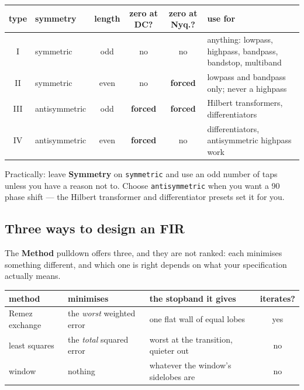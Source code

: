 \documentclass[11pt,a4paper]{article}
\newcommand{\ctl}[1]{\textbf{#1}}
\newcommand{\lit}[1]{\texttt{#1}}
\begin{document}
\begin{center}
\begin{tabular}{@{}clccc>{\raggedright\arraybackslash}p{45mm}@{}}
  \toprule
  \textbf{type} & \textbf{symmetry} & \textbf{length} &
  \textbf{zero at DC?} & \textbf{zero at Nyq.?} & \textbf{use for} \\
  \midrule
  I   & symmetric     & odd  & no  & no  & anything: lowpass, highpass,
                                            bandpass, bandstop, multiband \\
  \addlinespace
  II  & symmetric     & even & no  & \textbf{forced} & lowpass and bandpass
                                            only; never a highpass \\
  \addlinespace
  III & antisymmetric & odd  & \textbf{forced} & \textbf{forced} & Hilbert
                                            transformers, differentiators \\
  \addlinespace
  IV  & antisymmetric & even & \textbf{forced} & no & differentiators,
                                            antisymmetric highpass work \\
  \bottomrule
\end{tabular}
\end{center}

Practically: leave \ctl{Symmetry} on \lit{symmetric} and use an odd number of
taps unless you have a reason not to. Choose \lit{antisymmetric} when you want a
90\textdegree{} phase shift --- the Hilbert transformer and differentiator
presets set it for you.

\subsection{Three ways to design an FIR}
\label{sec:methods}

The \ctl{Method} pulldown offers three, and they are not ranked: each minimises
something different, and which one is right depends on what your specification
actually means.

\begin{tabularx}{\textwidth}{@{}lllc@{}}
  \toprule
  \textbf{method} & \textbf{minimises} & \textbf{the stopband it gives}
    & \textbf{iterates?} \\
  \midrule
  Remez exchange & the \emph{worst} weighted error
    & one flat wall of equal lobes & yes \\
  least squares & the \emph{total} squared error
    & worst at the transition, quieter out & no \\
  window & nothing & whatever the window's sidelobes are & no \\
  \bottomrule
\end{tabularx}
\end{document}
